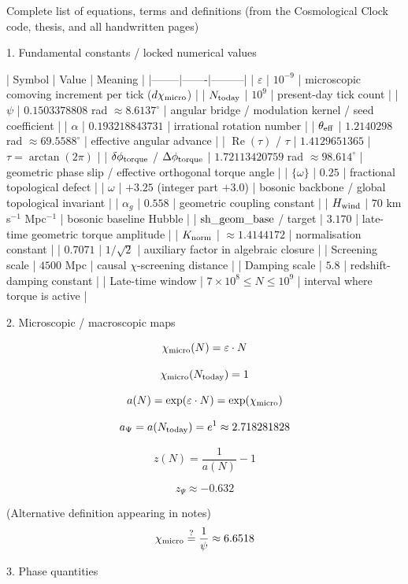 Complete list of equations, terms and definitions  
(from the Cosmological Clock code, thesis, and all handwritten pages)

1. Fundamental constants / locked numerical values

| Symbol | Value | Meaning |
|--------|-------|---------|
| \(\varepsilon\) | \(10^{-9}\) | microscopic comoving increment per tick (\(d\chi_{\rm micro}\)) |
| \(N_{\rm today}\) | \(10^{9}\) | present-day tick count |
| \(\psi\) | \(0.1503378808\) rad \(\approx 8.6137^\circ\) | angular bridge / modulation kernel / seed coefficient |
| \(\alpha\) | \(0.193218843731\) | irrational rotation number |
| \(\theta_{\rm eff}\) | \(1.2140298\) rad \(\approx 69.5588^\circ\) | effective angular advance |
| \(\operatorname{Re}(\tau)\) / \(\tau\) | \(1.4129651365\) | \(\tau=\arctan(2\pi)\) |
| \(\delta\phi_{\rm torque}\) / \(\Delta\phi_{\rm torque}\) | \(1.72113420759\) rad \(\approx 98.614^\circ\) | geometric phase slip / effective orthogonal torque angle |
| \(\{\omega\}\) | \(0.25\) | fractional topological defect |
| \(\omega\) | \(+3.25\) (integer part \(+3.0\)) | bosonic backbone / global topological invariant |
| \(\alpha_g\) | \(0.558\) | geometric coupling constant |
| \(H_{\rm wind}\) | \(70\) km s\(^{-1}\) Mpc\(^{-1}\) | bosonic baseline Hubble |
| \({\rm sh\_geom\_base}\) / target | \(3.170\) | late-time geometric torque amplitude |
| \(K_{\rm norm}\) | \(\approx 1.4144172\) | normalisation constant |
| \(0.7071\) | \(1/\sqrt{2}\) | auxiliary factor in algebraic closure |
| Screening scale | \(4500\) Mpc | causal \(\chi\)-screening distance |
| Damping scale | \(5.8\) | redshift-damping constant |
| Late-time window | \(7\times 10^{8}\le N\le 10^{9}\) | interval where torque is active |

2. Microscopic / macroscopic maps

\[
\chi_{\rm micro}(N)=\varepsilon\cdot N
\]

\[
\chi_{\rm micro}(N_{\rm today})=1
\]

\[
a(N)=\exp(\varepsilon\cdot N)=\exp(\chi_{\rm micro})
\]

\[
a_{\Psi}=a(N_{\rm today})=e^{1}\approx 2.718281828
\]

\[
z(N)=\frac{1}{a(N)}-1
\]

\[
z_{\Psi}\approx -0.632
\]

(Alternative definition appearing in notes)  
\[
\chi_{\rm micro}\stackrel{?}{=}\frac{1}{\psi}\approx 6.6518
\]

3. Phase quantities

